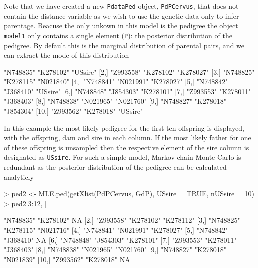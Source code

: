 \documentclass{article}
\begin{document}
Note that we have created a new \texttt{PdataPed} object, \texttt{PdPCervus}, that does not contain the distance variable as we wish to use the genetic data only to infer parentage.  Beacuse the only unkown in this model is the pedigree the object \texttt{model1} only contains a single element (\texttt{P}): the posterior distribution of the pedigree.  By default this is the marginal distribution of parental pairs, and we can extract the mode of this distribution

\begin{Schunk}
\begin{Soutput}
      [,1]      [,2]      [,3]     
 [1,] "N748835" "K278102" "USsire" 
 [2,] "Z993558" "K278102" "K278027"
 [3,] "N748825" "K278115" "N021840"
 [4,] "N748841" "N021991" "K278027"
 [5,] "N748842" "J368410" "USsire" 
 [6,] "N748848" "J854303" "K278101"
 [7,] "Z993553" "K278011" "J368403"
 [8,] "N748838" "N021965" "N021760"
 [9,] "N748827" "K278018" "J854304"
[10,] "Z993562" "K278018" "USsire" 
\end{Soutput}
\end{Schunk}

In this example the most likely pedigree for the first ten offspring is displayed, with the offspring, dam and sire in each column.  If the most likely father for one of these offspring is unsampled then the respective element of the sire column is designated as \texttt{USsire}. For such a simple model, Markov chain Monte Carlo is redundant as the posterior distribution of the pedigree can be calculated analyticly

\begin{Schunk}
\begin{Sinput}
> ped2 <- MLE.ped(getXlist(PdPCervus, GdP), USsire = TRUE, nUSsire = 10)
> ped2[3:12, ]
\end{Sinput}
\begin{Soutput}
      [,1]      [,2]      [,3]     
 [1,] "N748835" "K278102" NA       
 [2,] "Z993558" "K278102" "K278112"
 [3,] "N748825" "K278115" "N021716"
 [4,] "N748841" "N021991" "K278027"
 [5,] "N748842" "J368410" NA       
 [6,] "N748848" "J854303" "K278101"
 [7,] "Z993553" "K278011" "J368403"
 [8,] "N748838" "N021965" "N021760"
 [9,] "N748827" "K278018" "N021839"
[10,] "Z993562" "K278018" NA       
\end{Soutput}
\end{Schunk}
\end{document}
